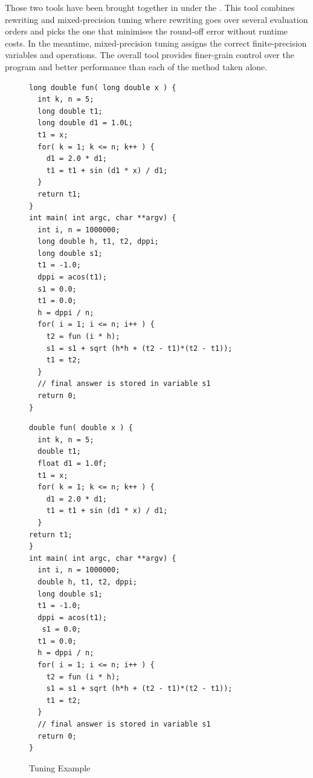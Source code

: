 Those two tools have been brought together in \cite{Darulova2018} under the . This tool combines rewriting and mixed-precision tuning where rewriting goes over several evaluation orders and picks the one that minimises the round-off error without runtime costs. In the meantime, mixed-precision tuning assigns the correct finite-precision variables and operations. The overall tool provides finer-grain control over the program and better performance than each of the method taken alone.
\begin{figure}[htbp]
\centering
\begin{minipage}{.48\textwidth}
\begin{lstlisting}[style=CInputStyle]
long double fun( long double x ) {
  int k, n = 5;
  long double t1;
  long double d1 = 1.0L;
  t1 = x;
  for( k = 1; k <= n; k++ ) {
    d1 = 2.0 * d1;
    t1 = t1 + sin (d1 * x) / d1;
  }
  return t1;
}
int main( int argc, char **argv) {
  int i, n = 1000000;
  long double h, t1, t2, dppi;
  long double s1;
  t1 = -1.0;
  dppi = acos(t1);
  s1 = 0.0;
  t1 = 0.0;
  h = dppi / n;
  for( i = 1; i <= n; i++ ) {
    t2 = fun (i * h);
    s1 = s1 + sqrt (h*h + (t2 - t1)*(t2 - t1));
    t1 = t2;
  }
  // final answer is stored in variable s1
  return 0;
}
\end{lstlisting}
\end{minipage}
\hfill
\begin{minipage}{.48\textwidth}
\begin{lstlisting}[style=CInputStyle]
double fun( double x ) {
  int k, n = 5;
  double t1;
  float d1 = 1.0f;
  t1 = x;
  for( k = 1; k <= n; k++ ) {
    d1 = 2.0 * d1;
    t1 = t1 + sin (d1 * x) / d1;
  }
return t1;
}
int main( int argc, char **argv) {
  int i, n = 1000000;
  double h, t1, t2, dppi;
  long double s1;
  t1 = -1.0;
  dppi = acos(t1);
   s1 = 0.0;
  t1 = 0.0;
  h = dppi / n;
  for( i = 1; i <= n; i++ ) {
    t2 = fun (i * h);
    s1 = s1 + sqrt (h*h + (t2 - t1)*(t2 - t1));
    t1 = t2;
  }
  // final answer is stored in variable s1
  return 0;
}
\end{lstlisting}
\end{minipage}
\caption[Tuning]{Tuning Example \cite{Rubio2013}}
	\label{fig:Tuning}
\end{figure}

